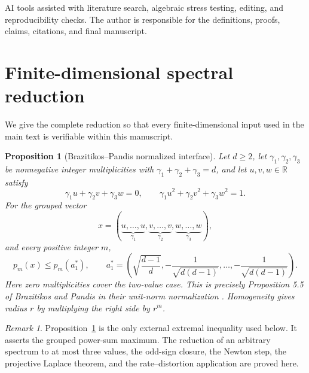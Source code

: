 \documentclass[11pt,a4paper]{article}
\newtheorem{proposition}[theorem]{Proposition}
\theoremstyle{remark}
\newtheorem{remark}[theorem]{Remark}
\newcommand{\R}{\mathbb{R}}
\begin{document}
AI tools assisted with literature search, algebraic stress testing, editing,
and reproducibility checks.  The author is responsible for the definitions,
proofs, claims, citations, and final manuscript.

\appendix

\section{Finite-dimensional spectral reduction}
\label{app:finite}

We give the complete reduction so that every finite-dimensional input used in
the main text is verifiable within this manuscript.

\begin{proposition}[Brazitikos--Pandis normalized interface]
\label{prop:bp-interface}
Let $d\ge2$, let $\gamma_1,\gamma_2,\gamma_3$ be nonnegative integer
multiplicities with $\gamma_1+\gamma_2+\gamma_3=d$, and let $u,v,w\in\R$
satisfy
\begin{equation}
 \gamma_1u+\gamma_2v+\gamma_3w=0,
 \qquad
 \gamma_1u^2+\gamma_2v^2+\gamma_3w^2=1.
 \label{eq:bp-interface-constraints}
\end{equation}
For the grouped vector
\begin{equation}
 x=(\underbrace{u,\ldots,u}_{\gamma_1},
    \underbrace{v,\ldots,v}_{\gamma_2},
    \underbrace{w,\ldots,w}_{\gamma_3}),
\end{equation}
and every positive integer $m$,
\begin{equation}
 p_m(x)\le p_m(a^*_1),
 \qquad
 a^*_1=\left(\sqrt{\frac{d-1}{d}},
 -\frac1{\sqrt{d(d-1)}},\ldots,
 -\frac1{\sqrt{d(d-1)}}\right).
 \label{eq:bp-interface-bound}
\end{equation}
Here zero multiplicities cover the two-value case.  This is precisely
Proposition 5.5 of Brazitikos and Pandis in their unit-norm normalization
\cite{BrazitikosPandis2025}.  Homogeneity gives radius $r$ by multiplying the
right side by $r^m$.
\end{proposition}

\begin{remark}
Proposition~\ref{prop:bp-interface} is the only external extremal inequality
used below.  It asserts the grouped power-sum maximum.  The reduction of an
arbitrary spectrum to at most three values, the odd-sign closure, the Newton
step, the projective Laplace theorem, and the rate--distortion application are
proved here.
\end{remark}
\end{document}
